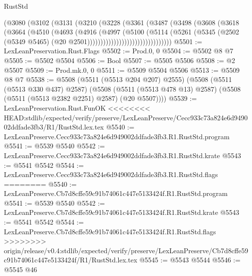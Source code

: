 \begin{lexlean}{RustStd}
\begin{coremodule}
{\begin{coremodule}
{{{{{{{{{{{{{{{{{{{{{{{{{{                          (@3080
                            (@3102
                              (@3131
                                (@3210
                                  (@3228
                                    (@3361
                                      (@3487
                                        (@3498
                                          (@3608
                                            (@3618
                                              (@3664
                                                (@4510
                                                  (@4693
                                                    (@4916
                                                      (@4997
                                                        (@5100
                                                          (@5114
                                                            (@5261
                                                              (@5345
                                                                (@2502
                                                                  (@5349 @5465)
                                                                  (@20
                                                                    @2501))))))))))))))))))))))))))))))))
@5501 := LexLeanPreservation.Rust.Flags
@5502 := Prod.{0, 0}
@5504 := @5502 @8 @7
@5505 := @5502 @5504
@5506 := Bool
@5507 := @5505 @5506
@5508 := @2 @5507
@5509 := Prod.mk.{0, 0}
@5511 := @5509 @5504 @5506
@5513 := @5509 @8 @7
@5538 := @5508
    (@5511 (@5513 @204 @207) @2555)
    (@5508
      (@5511 (@5513 @330 @437) @2587)
      (@5508 (@5511 (@5513 @478 @13) @2587) (@5508 (@5511 (@5513 @2382 @2251) @2587) (@20 @5507))))
@5539 := LexLeanPreservation.Rust.FunOK
<<<<<<<< HEAD:stdlib/expected/verify/preserve/LexLeanPreserve/Cecc933c73a824e6d949002ddfade3fb3/R1/RustStd.lex.tex
@5540 := LexLeanPreserve.Cecc933c73a824e6d949002ddfade3fb3.R1.RustStd.program
@5541 := @5539 @5540
@5542 := LexLeanPreserve.Cecc933c73a824e6d949002ddfade3fb3.R1.RustStd.krate
@5543 := @5541 @5542
@5544 := LexLeanPreserve.Cecc933c73a824e6d949002ddfade3fb3.R1.RustStd.flags
========
@5540 := LexLeanPreserve.Cb7d8cffe59c91b74061c447e5133424f.R1.RustStd.program
@5541 := @5539 @5540
@5542 := LexLeanPreserve.Cb7d8cffe59c91b74061c447e5133424f.R1.RustStd.krate
@5543 := @5541 @5542
@5544 := LexLeanPreserve.Cb7d8cffe59c91b74061c447e5133424f.R1.RustStd.flags
>>>>>>>> origin/release/v0.4:stdlib/expected/verify/preserve/LexLeanPreserve/Cb7d8cffe59c91b74061c447e5133424f/R1/RustStd.lex.tex
@5545 := @5543 @5544
@5546 := @5545 @46
}}}}}}}}}}}}}}}}}}}}}}}}}}
\end{coremodule}}
\end{coremodule}
\end{lexlean}
